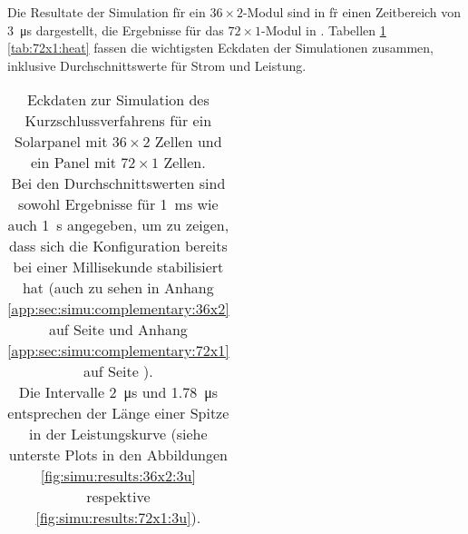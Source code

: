 Die    Resultate   der    Simulation   f\"ir    ein   $36    \times   2$-Modul
sind   in      f\"r   einen   Zeitbereich   von
\SI{3}{\micro\second}  dargestellt,  die  Ergebnisse   f\"ur  das  $72  \times
1$-Modul  in  .   Tabellen  \ref{tab:36x2:heat}
\ref{tab:72x1:heat} fassen die wichtigsten Eckdaten der Simulationen zusammen,
inklusive Durchschnittswerte f\"ur Strom und Leistung.

\begin{table}[h!tb]
    \centering
    \caption{%
        Eckdaten zur Simulation des Kurzschlussverfahrens f\"ur ein Solarpanel
        mit  $36   \times  2$  Zellen  und   ein  Panel  mit  $72   \times  1$
        Zellen.\protect\\
        Bei     den     Durchschnittswerten     sind     sowohl     Ergebnisse
        f\"ur      \SI{1}{\milli\second}     wie      auch     \SI{1}{\second}
        angegeben,    um   zu    zeigen,   dass    sich   die    Konfiguration
        bereits    bei    einer    Millisekunde   stabilisiert    hat    (auch
        zu     sehen    in     Anhang    \ref{app:sec:simu:complementary:36x2}
        auf      Seite      \pageref{app:sec:simu:complementary:36x2}      und
        Anhang      \ref{app:sec:simu:complementary:72x1}       auf      Seite
        \pageref{app:sec:simu:complementary:72x1}).\protect\\
        Die  Intervalle   \SI{2}{\micro\second}  und  \SI{1.78}{\micro\second}
        entsprechen  der L\"ange  einer  Spitze in  der Leistungskurve  (siehe
        unterste  Plots  in   den  Abbildungen  \ref{fig:simu:results:36x2:3u}
        respektive \ref{fig:simu:results:72x1:3u}).%
    }
    \label{tab:36x2:heat}
    \begin{tabular}{lrr}


\end{tabular}
\end{table}
